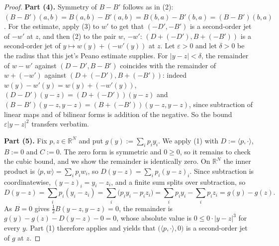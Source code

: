 \begin{proof}
\medskip\noindent\textbf{Part (4).} Symmetry of $B-B'$ follows as in (2):
$(B-B')(a,b)=B(a,b)-B'(a,b)=B(b,a)-B'(b,a)=(B-B')(b,a)$. For the estimate, apply (3) to
$w'$ to get that $(-D',-B')$ is a second-order jet of $-w'$ at $z$, and then (2) to the
pair $w$, $-w'$: $(D+(-D'),B+(-B'))$ is a second-order jet of $y\mapsto w(y)+(-w'(y))$ at
$z$. Let $\varepsilon>0$ and let $\delta>0$ be the radius that this jet's Peano estimate
supplies. For $|y-z|<\delta$, the remainder of $w-w'$ against $(D-D',B-B')$ coincides
with the remainder of $w+(-w')$ against $(D+(-D'),B+(-B'))$: indeed
$w(y)-w'(y)=w(y)+(-w'(y))$, $(D-D')(y-z)=(D+(-D'))(y-z)$ and
$(B-B')(y-z,y-z)=(B+(-B'))(y-z,y-z)$, since subtraction of linear maps and of bilinear
forms is addition of the negative. So the bound $\varepsilon|y-z|^{2}$ transfers verbatim.

\medskip\noindent\textbf{Part (5).} Fix $p,z\in\mathbb R^{N}$ and put
$g(y):=\sum_{i}p_iy_i$. We apply (1) with $D:=\langle p,\cdot\rangle$, $B:=0$ and $C:=0$.
The zero form is symmetric and $0\ge0$, so it remains to check the cubic bound, and we show
the remainder is identically zero. On $\mathbb R^{N}$ the inner product is
$\langle p,w\rangle=\sum_{i}p_iw_i$, so $D(y-z)=\sum_{i}p_i(y-z)_i$. Since subtraction is
coordinatewise, $(y-z)_i=y_i-z_i$, and a finite sum splits over subtraction, so
\[
 D(y-z)=\sum_{i}p_i(y_i-z_i)=\sum_{i}\big(p_iy_i-p_iz_i\big)
  =\sum_{i}p_iy_i-\sum_{i}p_iz_i=g(y)-g(z).
\]
As $B=0$ gives $\tfrac12B(y-z,y-z)=0$, the remainder is
$g(y)-g(z)-D(y-z)-0=0$, whose absolute value is $0\le0\cdot|y-z|^{3}$ for every $y$. Part
(1) therefore applies and yields that $\big(\langle p,\cdot\rangle,0\big)$ is a
second-order jet of $g$ at $z$.
\end{proof}

